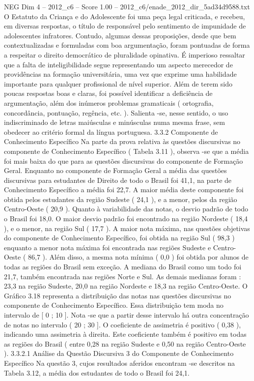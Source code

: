 \begin{textsample}{NEG Dim 4 – 2012\_c6 – Score 1.00 – 2012\_c6/enade\_2012\_dir\_5ad34d9588.txt}
O Estatuto da Criança e do Adolescente foi uma peça legal criticada, e recebeu, em diversas respostas, o título de responsável pelo sentimento de impunidade de adolescentes infratores.
Contudo, algumas dessas proposições, desde que bem contextualizadas e formuladas com boa argumentação, foram pontuadas de forma a respeitar o direito democrático de pluralidade opinativa.
É imperioso ressaltar que a falta de inteligibilidade segue representando um aspecto merecedor de providências na formação universitária, uma vez que exprime uma habilidade importante para qualquer profissional de nível superior.
Além de terem sido poucas respostas boas e claras, foi possível identificar a deficiência de argumentação, além dos inúmeros problemas gramaticais ( ortografia, concordância, pontuação, regência, etc. ).
Salienta -se, nesse sentido, o uso indiscriminado de letras maiúsculas e minúsculas numa mesma frase, sem obedecer ao critério formal da língua portuguesa. 3.3.2 Componente de Conhecimento Específico Na parte da prova relativa às questões discursivas no componente de Conhecimento Específico ( Tabela 3.11 ), observa -se que a média foi mais baixa do que para as questões discursivas do componente de Formação Geral.
Enquanto no componente de Formação Geral a média das questões discursivas para estudantes de Direito de todo o Brasil foi 41,1, na parte de Conhecimento Específico a média foi 22,7.
A maior média deste componente foi obtida pelos estudantes da região Sudeste ( 24,1 ), e a menor, pelos da região Centro-Oeste ( 20,9 ).
Quanto à variabilidade das notas, o desvio padrão de todo o Brasil foi 18,0.
O maior desvio padrão foi encontrado na região Nordeste ( 18,4 ), e o menor, na região Sul ( 17,7 ).
A maior nota máxima, nas questões objetivas do componente de Conhecimento Específico, foi obtida na região Sul ( 98,3 ) enquanto a menor nota máxima foi encontrada nas regiões Sudeste e Centro-Oeste ( 86,7 ).
Além disso, a mesma nota mínima ( 0,0 ) foi obtida por alunos de todas as regiões do Brasil sem exceção.
A mediana do Brasil como um todo foi 21,7, também encontrada nas regiões Norte e Sul.
As demais medianas foram : 23,3 na região Sudeste, 20,0 na região Nordeste e 18,3 na região Centro-Oeste.
O Gráfico 3.18 representa a distribuição das notas nas questões discursivas no componente de Conhecimento Específico.
Essa distribuição tem moda no intervalo de [ 0 ; 10 ].
Nota -se que a partir desse intervalo há outra concentração de notas no intervalo ( 20 ; 30 ].
O coeficiente de assimetria é positivo ( 0,38 ), indicando uma assimetria à direita.
Este coeficiente também é positivo em todas as regiões do Brasil ( entre 0,28 na região Sudeste e 0,50 na região Centro-Oeste ). 3.3.2.1 Análise da Questão Discursiva 3 do Componente de Conhecimento Específico Na questão 3, cujos resultados aferidos encontram -se descritos na Tabela 3.12, a média dos estudantes de todo o Brasil foi 24,1.

\end{textsample}
